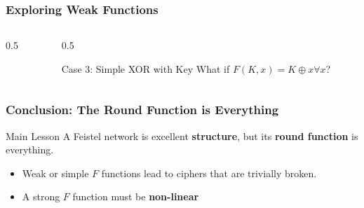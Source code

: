\documentclass{cubeamer}
\begin{document}
\begin{frame}[fragile]
    \frametitle{Exploring Weak Functions}
    \begin{columns}[T]
        \begin{column}{0.5\textwidth}
            \feisteldiagram %
        \end{column}

        \begin{column}{0.5\textwidth}
            \begin{block}{Case 3: Simple XOR with Key}
                What if $F(K, x) = K \oplus x \forall x$?
            \end{block}

            \pause

            \pause

        \end{column}
    \end{columns}
\end{frame}

\begin{frame}
    \frametitle{Conclusion: The Round Function is Everything}

    \begin{block}{Main Lesson}
        A Feistel network is excellent \textbf{structure}, but its \textbf{round function} is everything.
    \end{block}

    \begin{itemize}
        \item<2-> Weak or simple $F$ functions lead to ciphers that are trivially broken.
        \item<3-> A strong $F$ function must be \textbf{non-linear}
    \end{itemize}

\end{frame}
\end{document}
